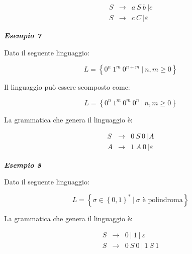 \documentclass[a4paper]{article}
\begin{document}
	\begin{equation*}
		\begin{array}{lll}
			S & \longrightarrow & a \: S \: b \: | c \\
			S & \longrightarrow & c \: C \: | \varepsilon
		\end{array}
	\end{equation*}
	
	\newpage
	
	\noindent
	\textcolor{Green4}{\textbf{\emph{Esempio 7}}}
	
	\noindent
	Dato il seguente linguaggio:
	
	\begin{equation*}
		L = \left\{0^{n} \: 1^{m} \: 0^{n + m} \: | \: n,m \ge 0\right\}
	\end{equation*}

	\noindent
	Il linguaggio può essere scomposto come:
	
	\begin{equation*}
		L = \left\{0^{n} \: 1^{m} \: 0^{m} \: 0^{n} \: | \: n,m \ge 0\right\}
	\end{equation*}

	\noindent
	La grammatica che genera il linguaggio è:
	
	\begin{equation*}
		\begin{array}{lll}
			S & \longrightarrow & 0 \: S \: 0 \: | A \\
			A & \longrightarrow & 1 \: A \: 0 \: | \varepsilon
		\end{array}
	\end{equation*}
	\:\newline
	
	\noindent
	\textcolor{Green4}{\textbf{\emph{Esempio 8}}}
	
	\noindent
	Dato il seguente linguaggio:
	
	\begin{equation*}
		L = \left\{\sigma \in \left\{0,1\right\}^{*} \: \left| \: \sigma \text{ è polindroma} \right.\right\}
	\end{equation*}

	\noindent
	La grammatica che genera il linguaggio è:
	
	\begin{equation*}
		\begin{array}{lll}
			S & \longrightarrow & 0 \: | \: 1 \: | \: \varepsilon \\
			S & \longrightarrow & 0 \: S \: 0 \: | \: 1 \: S \: 1
		\end{array}
	\end{equation*}
	\:\newline
	
\end{document}
